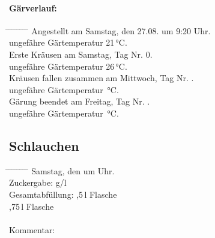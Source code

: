 \documentclass[12pt,oneside,a4paper]{scrartcl}
\begin{document}
{\paragraph{Gärverlauf:}
	\begin{tabbing}
		\hspace{1cm} \= \hspace{1cm} \= \hspace{1cm} \= \hspace{1cm} \= \hspace{1cm} \= \hspace{1cm} \= \hspace{1cm} \= \hspace{1cm} \= \kill
		\> Angestellt am Samstag, den 27.08. um 9:20 Uhr.\\
		\> \> ungefähre Gärtemperatur  21\,°C.\\
		\> Erste Kräusen am Samstag,  Tag Nr. 0.\\
		\> \> ungefähre Gärtemperatur 26\,°C.\\
		\> Kräusen fallen zusammen am Mittwoch, Tag Nr. .\\
		\> \> ungefähre Gärtemperatur \,°C.\\
		\> Gärung beendet am Freitag, Tag Nr. .\\
		\> \> ungefähre Gärtemperatur \,°C.
	\end{tabbing}
%
\subsection*{Schlauchen}
	\begin{tabbing}
		\hspace{1cm} \= \hspace{1cm} \= \hspace{1cm} \= \hspace{1cm} \= \hspace{1cm} \= \hspace{1cm} \= \hspace{1cm} \= \hspace{1cm} \= \kill
		\> Samstag, den  um  Uhr.\\
		\> Zuckergabe:  g/l\\
		\> Gesamtabfüllung: \> \> \> \>  ,5\,l Flasche\\
		\> \> \> \> \>  ,75\,l Flasche\\
		\\
		\> Kommentar: \>\>\>\\
	\end{tabbing}
%
}
\end{document}

